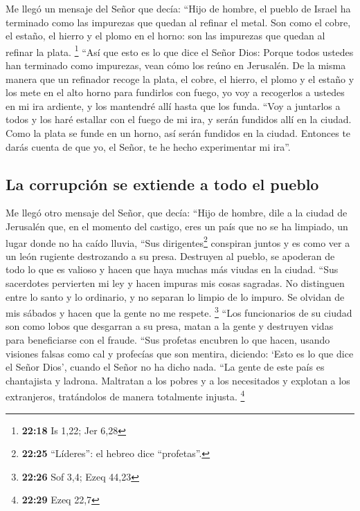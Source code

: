  Me llegó un mensaje del Señor que decía: 
``Hijo de hombre, el pueblo de Israel ha terminado como las impurezas
que quedan al refinar el metal. Son como el cobre, el estaño, el hierro
y el plomo en el horno: son las impurezas que quedan al refinar la
plata. \footnote{\textbf{22:18} Is 1,22; Jer 6,28}  ``Así
que esto es lo que dice el Señor Dios: Porque todos ustedes han
terminado como impurezas, vean cómo los reúno en Jerusalén.
 De la misma manera que un refinador recoge la plata, el
cobre, el hierro, el plomo y el estaño y los mete en el alto horno para
fundirlos con fuego, yo voy a recogerlos a ustedes en mi ira ardiente, y
los mantendré allí hasta que los funda.  ``Voy a
juntarlos a todos y los haré estallar con el fuego de mi ira, y serán
fundidos allí en la ciudad.  Como la plata se funde en un
horno, así serán fundidos en la ciudad. Entonces te darás cuenta de que
yo, el Señor, te he hecho experimentar mi ira''.

\hypertarget{la-corrupciuxf3n-se-extiende-a-todo-el-pueblo}{%
\subsection{La corrupción se extiende a todo el
pueblo}\label{la-corrupciuxf3n-se-extiende-a-todo-el-pueblo}}

 Me llegó otro mensaje del Señor, que decía:
 ``Hijo de hombre, dile a la ciudad de Jerusalén que, en
el momento del castigo, eres un país que no se ha limpiado, un lugar
donde no ha caído lluvia,  ``Sus dirigentes\footnote{\textbf{22:25}
  ``Líderes'': el hebreo dice ``profetas''.} conspiran juntos y es como
ver a un león rugiente destrozando a su presa. Destruyen al pueblo, se
apoderan de todo lo que es valioso y hacen que haya muchas más viudas en
la ciudad.  ``Sus sacerdotes pervierten mi ley y hacen
impuras mis cosas sagradas. No distinguen entre lo santo y lo ordinario,
y no separan lo limpio de lo impuro. Se olvidan de mis sábados y hacen
que la gente no me respete. \footnote{\textbf{22:26} Sof 3,4; Ezeq 44,23}
 ``Los funcionarios de su ciudad son como lobos que
desgarran a su presa, matan a la gente y destruyen vidas para
beneficiarse con el fraude.  ``Sus profetas encubren lo
que hacen, usando visiones falsas como cal y profecías que son mentira,
diciendo: `Esto es lo que dice el Señor Dios', cuando el Señor no ha
dicho nada.  ``La gente de este país es chantajista y
ladrona. Maltratan a los pobres y a los necesitados y explotan a los
extranjeros, tratándolos de manera totalmente injusta. \footnote{\textbf{22:29}
  Ezeq 22,7}

